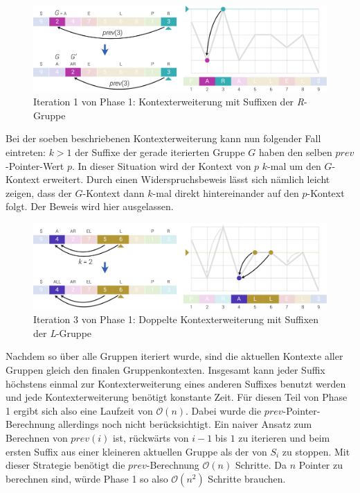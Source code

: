 \documentclass[twoside,11pt]{article}
\theoremstyle{break}
\begin{document}
\begin{figure}[h]
	\centering
	\includegraphics[width=\linewidth,bb=0 0 1310 386]{./assets/phase1-R.pdf}
	\caption{Iteration 1 von Phase 1: Kontexterweiterung mit Suffixen der \textit{R}-Gruppe}
\label{fig:phase1-R}
\end{figure}

Bei der soeben beschriebenen Kontexterweiterung kann nun folgender Fall eintreten: $k > 1$ der Suffixe der gerade iterierten Gruppe $G$ haben den selben $prev$-Pointer-Wert $p$. In dieser Situation wird der Kontext von $p$ $k$-mal um den $G$-Kontext erweitert. Durch einen Widerspruchsbeweis lässt sich nämlich leicht zeigen, dass der $G$-Kontext dann $k$-mal direkt hintereinander auf den $p$-Kontext folgt. Der Beweis wird hier ausgelassen.

\begin{figure}[h]
	\centering
	\includegraphics[width=\linewidth,bb=0 0 1310 386]{./assets/phase1-L.pdf}
	\caption{Iteration 3 von Phase 1: Doppelte Kontexterweiterung mit Suffixen der \textit{L}-Gruppe}
\label{fig:phase1-L}
\end{figure}

Nachdem so über alle Gruppen iteriert wurde, sind die aktuellen Kontexte aller Gruppen gleich den finalen Gruppenkontexten. Insgesamt kann jeder Suffix höchstens einmal zur Kontexterweiterung eines anderen Suffixes benutzt werden und jede Kontexterweiterung benötigt konstante Zeit. Für diesen Teil von Phase 1 ergibt sich also eine Laufzeit von $\mathcal{O}(n)$. Dabei wurde die $prev$-Pointer-Berechnung allerdings noch nicht berücksichtigt. Ein naiver Ansatz zum Berechnen von $prev(i)$ ist, rückwärts von $i - 1$ bis $1$ zu iterieren und beim ersten Suffix aus einer kleineren aktuellen Gruppe als der von $S_i$ zu stoppen. Mit dieser Strategie benötigt die $prev$-Berechnung $\mathcal{O}(n)$ Schritte. Da $n$ Pointer zu berechnen sind, würde Phase 1 so also $\mathcal{O}(n^2)$ Schritte brauchen.\\
\end{document}
